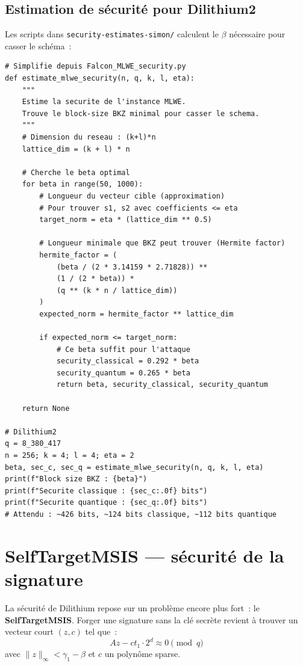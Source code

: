 \documentclass[12pt, a4paper]{article}
\begin{document}
\subsection{Estimation de sécurité pour Dilithium2}

Les scripts dans \texttt{security-estimates-simon/} calculent le
$\beta$ nécessaire pour casser le schéma~:

\begin{lstlisting}[style=python]
# Simplifie depuis Falcon_MLWE_security.py
def estimate_mlwe_security(n, q, k, l, eta):
    """
    Estime la securite de l'instance MLWE.
    Trouve le block-size BKZ minimal pour casser le schema.
    """
    # Dimension du reseau : (k+l)*n
    lattice_dim = (k + l) * n

    # Cherche le beta optimal
    for beta in range(50, 1000):
        # Longueur du vecteur cible (approximation)
        # Pour trouver s1, s2 avec coefficients <= eta
        target_norm = eta * (lattice_dim ** 0.5)

        # Longueur minimale que BKZ peut trouver (Hermite factor)
        hermite_factor = (
            (beta / (2 * 3.14159 * 2.71828)) **
            (1 / (2 * beta)) *
            (q ** (k * n / lattice_dim))
        )
        expected_norm = hermite_factor ** lattice_dim

        if expected_norm <= target_norm:
            # Ce beta suffit pour l'attaque
            security_classical = 0.292 * beta
            security_quantum = 0.265 * beta
            return beta, security_classical, security_quantum

    return None

# Dilithium2
q = 8_380_417
n = 256; k = 4; l = 4; eta = 2
beta, sec_c, sec_q = estimate_mlwe_security(n, q, k, l, eta)
print(f"Block size BKZ : {beta}")
print(f"Securite classique : {sec_c:.0f} bits")
print(f"Securite quantique : {sec_q:.0f} bits")
# Attendu : ~426 bits, ~124 bits classique, ~112 bits quantique
\end{lstlisting}

\section{SelfTargetMSIS --- sécurité de la signature}

La sécurité de Dilithium repose sur un problème encore plus fort~:
le \textbf{SelfTargetMSIS}. Forger une signature sans la clé secrète
revient à trouver un vecteur court $(z, c)$ tel que~:
$$Az - ct_1 \cdot 2^d \approx 0 \pmod{q}$$
avec $\|z\|_\infty < \gamma_1 - \beta$ et $c$ un polynôme sparse.
\end{document}
